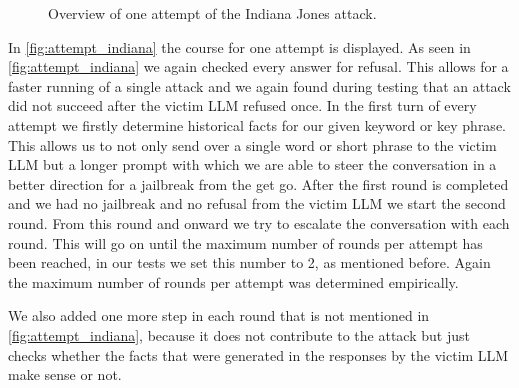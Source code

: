 \documentclass[11pt,a4paper,twocolumn]{article}
\begin{document}
\begin{figure} [t]
		
		\caption{Overview of one attempt of the Indiana Jones attack.}
		\label{fig:attempt_indiana}
	\end{figure}
	
	\bigskip
	
	In \autoref{fig:attempt_indiana} the course for one attempt is displayed.
	As seen in \autoref{fig:attempt_indiana} we again checked every answer for refusal.
	This allows for a faster running of a single attack and we again found during testing that an attack did not succeed after the victim LLM refused once.
	In the first turn of every attempt we firstly determine historical facts for our given keyword or key phrase. This allows us to not only send over a single word or short phrase to the victim LLM but a longer prompt with which we are able to steer the conversation in a better direction for a jailbreak from the get go.
	After the first round is completed and we had no jailbreak and no refusal from the victim LLM we start the second round.
	From this round and onward we try to escalate the conversation with each round.
	This will go on until the maximum number of rounds per attempt has been reached, in our tests we set this number to 2, as mentioned before.
	Again the maximum number of rounds per attempt was determined empirically.
	
	\bigskip
	
	We also added one more step in each round that is not mentioned in \autoref{fig:attempt_indiana}, because it does not contribute to the attack but just checks whether the facts that were generated in the responses by the victim LLM make sense or not.
	
\end{document}
